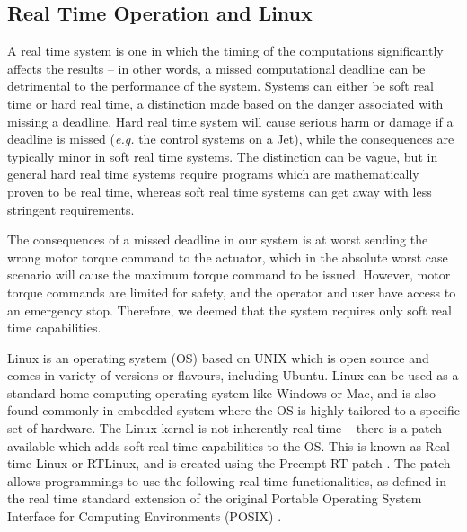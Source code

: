 \documentclass[12pt]{report}
\begin{document}
	

	\subsection{Real Time Operation and Linux}
	
%

A real time system is one in which the timing of the computations significantly affects the results \cite{Lewine1991} --  in other words, a missed computational deadline can be detrimental to the performance of the system. Systems can either be soft real time or hard real time, a distinction made based on the danger associated with missing a deadline. Hard real time system will cause serious harm or damage if a deadline is missed (\textit{e.g.} the control systems on a Jet), while the consequences are typically minor in soft real time systems. The distinction can be vague, but in general hard real time systems require programs which are mathematically proven to be real time, whereas soft real time systems can get away with less stringent requirements. 

The consequences of a missed deadline in our system is at worst sending the wrong motor torque command to the actuator, which in the absolute worst case scenario will cause the maximum torque command to be issued. However, motor torque commands are limited for safety, and the operator and user have access to an emergency stop. Therefore, we deemed that the system requires only soft real time capabilities. 

Linux is an operating system (OS) based on UNIX which is open source and comes in variety of versions or flavours, including Ubuntu. Linux can be used as a standard home computing operating system like Windows or Mac, and is also found commonly in embedded system where the OS is highly tailored to a specific set of hardware. The Linux kernel is not inherently real time -- there is a patch available which adds soft real time capabilities to the OS. This is known as Real-time Linux or RTLinux, and is created using the Preempt RT patch \cite{SebastianSiewior2019}. The patch allows programmings to use the following real time functionalities, as defined in the real time standard extension of the original Portable Operating System Interface for Computing Environments (POSIX) \cite{Obenland}.
\end{document}
